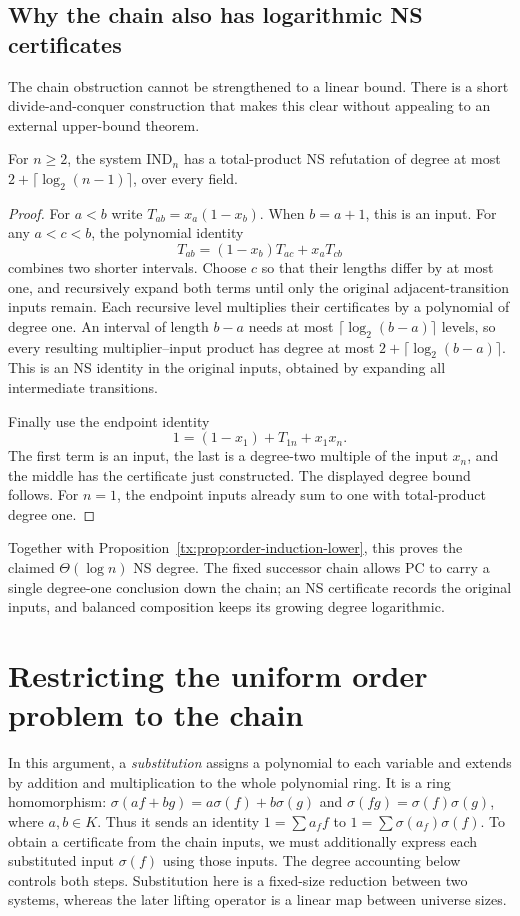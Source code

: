 \subsection{Why the chain also has logarithmic NS certificates}
The chain obstruction cannot be strengthened to a linear bound.
There is a short divide-and-conquer construction that makes this
clear without appealing to an external upper-bound theorem.

\begin{proposition}
\label{tx:prop:order-induction-upper}
For $n\ge2$, the system $\mathrm{IND}_n$ has a total-product NS
refutation of degree at most $2+\lceil\log_2(n-1)\rceil$, over every field.
\end{proposition}
\begin{proof}
For $a<b$ write $T_{ab}=x_a(1-x_b)$. When $b=a+1$, this is
an input. For any $a<c<b$, the polynomial identity
\[
 T_{ab}=(1-x_b)T_{ac}+x_aT_{cb}
\]
combines two shorter intervals. Choose $c$ so that their lengths
differ by at most one, and recursively expand both terms until only
the original adjacent-transition inputs remain. Each recursive level
multiplies their certificates by a polynomial of degree one. An
interval of length $b-a$ needs at most
$\lceil\log_2(b-a)\rceil$ levels, so every resulting multiplier--input
product has degree at most $2+\lceil\log_2(b-a)\rceil$.
This is an NS identity in the original inputs, obtained by expanding
all intermediate transitions.

Finally use the endpoint identity
\[
                1=(1-x_1)+T_{1n}+x_1x_n.
\]
The first term is an input, the last is a degree-two multiple of the
input $x_n$, and the middle has the certificate just constructed.
The displayed degree bound follows. For $n=1$, the endpoint inputs
already sum to one with total-product degree one.
\end{proof}

Together with Proposition~\ref{tx:prop:order-induction-lower}, this
proves the claimed $\Theta(\log n)$ NS degree. The fixed successor chain
allows PC to carry a single degree-one conclusion down the chain;
an NS certificate records the original inputs, and balanced
composition keeps its growing degree logarithmic.

\section{Restricting the uniform order problem to the chain}
In this argument, a \emph{substitution} assigns a polynomial to each
variable and extends by addition and multiplication to the whole
polynomial ring. It is a ring homomorphism:
$\sigma(af+bg)=a\sigma(f)+b\sigma(g)$ and
$\sigma(fg)=\sigma(f)\sigma(g)$, where $a,b\in K$.
Thus it sends an identity $1=\sum a_ff$ to
$1=\sum\sigma(a_f)\sigma(f)$.
To obtain a certificate from the chain inputs, we must additionally
express each substituted input $\sigma(f)$ using those inputs.
The degree accounting below controls both steps. Substitution here
is a fixed-size reduction between two systems, whereas the later
lifting operator is a linear map between universe sizes.

